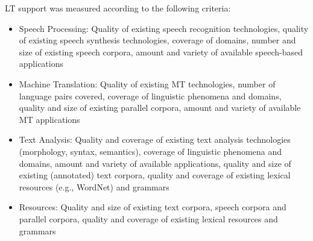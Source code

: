 \documentclass{scrartcl}
\begin{document}
\begin{Parallel}[c]{70mm}{70mm}
{LT support was measured according to the following criteria:
\begin{itemize}
\item Speech Processing: Quality of existing speech recognition technologies, quality of existing speech synthesis technologies, coverage of domains, number and size of existing speech corpora, amount and variety of available speech-based applications
\item Machine Translation: Quality of existing MT technologies, number of language pairs covered, coverage of linguistic phenomena and domains, quality and size of existing parallel corpora, amount and variety of available MT applications
\item Text Analysis: Quality and coverage of existing text analysis technologies (morphology, syntax, semantics), coverage of linguistic phenomena and domains, amount and variety of available applications, quality and size of existing (annotated) text corpora, quality and coverage of existing lexical resources (e.g., WordNet) and grammars
\item Resources: Quality and size of existing text corpora, speech corpora and parallel corpora, quality and coverage of existing lexical resources and grammars
\end{itemize} 

  }
  \ParallelPar
\end{Parallel}
\end{document}
